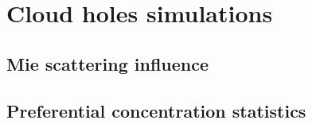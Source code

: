 \documentclass[../main.tex]{subfiles}
\begin{document}
\chapter{Cloud holes simulations} %

\label{ch:sim} %
\section{Mie scattering influence} %
\section{Preferential concentration statistics}
\end{document}
